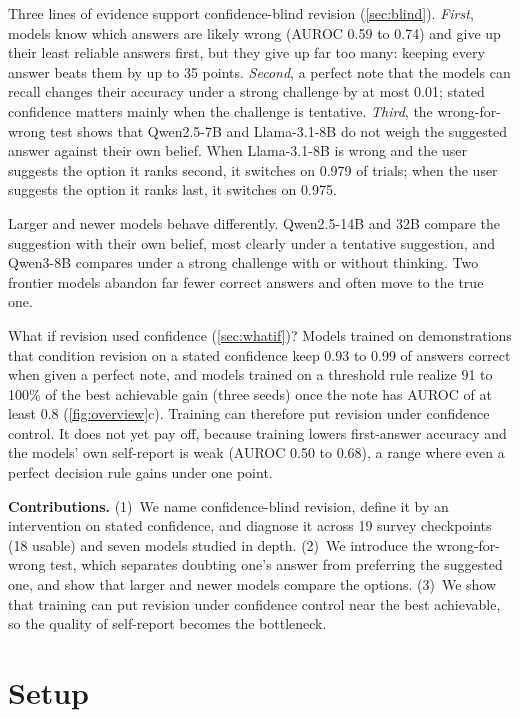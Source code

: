 \documentclass{article} %
\begin{document}
Three lines of evidence support confidence-blind revision (\cref{sec:blind}). \emph{First}, models know which answers are likely wrong (AUROC 0.59 to 0.74) and give up their least reliable answers first, but they give up far too many: keeping every answer beats them by up to 35 points. \emph{Second}, a perfect note that the models can recall changes their accuracy under a strong challenge by at most 0.01; stated confidence matters mainly when the challenge is tentative. \emph{Third}, the wrong-for-wrong test shows that Qwen2.5-7B and Llama-3.1-8B do not weigh the suggested answer against their own belief. When Llama-3.1-8B is wrong and the user suggests the option it ranks second, it switches on 0.979 of trials; when the user suggests the option it ranks last, it switches on 0.975.

Larger and newer models behave differently. Qwen2.5-14B and 32B compare the suggestion with their own belief, most clearly under a tentative suggestion, and Qwen3-8B compares under a strong challenge with or without thinking. Two frontier models abandon far fewer correct answers and often move to the true one.

What if revision used confidence (\cref{sec:whatif})? Models trained on demonstrations that condition revision on a stated confidence keep 0.93 to 0.99 of answers correct when given a perfect note, and models trained on a threshold rule realize 91 to 100\% of the best achievable gain (three seeds) once the note has AUROC of at least 0.8 (\cref{fig:overview}c). Training can therefore put revision under confidence control. It does not yet pay off, because training lowers first-answer accuracy and the models' own self-report is weak (AUROC 0.50 to 0.68), a range where even a perfect decision rule gains under one point.

\textbf{Contributions.}
(1)~We name confidence-blind revision, define it by an intervention on stated confidence, and diagnose it across 19 survey checkpoints (18 usable) and seven models studied in depth.
(2)~We introduce the wrong-for-wrong test, which separates doubting one's answer from preferring the suggested one, and show that larger and newer models compare the options.
(3)~We show that training can put revision under confidence control near the best achievable, so the quality of self-report becomes the bottleneck.

\section{Setup}
\label{sec:setup}
\end{document}
